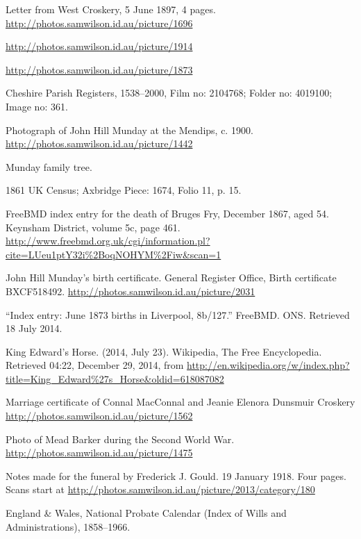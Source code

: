 \begin{thebibliography}{99}
	Letter from West Croskery, 5 June 1897, 4 pages.
	\url{http://photos.samwilson.id.au/picture/1696}

	\url{http://photos.samwilson.id.au/picture/1914}

	\url{http://photos.samwilson.id.au/picture/1873}

	Cheshire Parish Registers, 1538--2000, Film no: 2104768; Folder no: 4019100; Image no: 361.

	Photograph of John Hill Munday at the Mendips, c. 1900.
	\url{http://photos.samwilson.id.au/picture/1442}

	Munday family tree.

	1861 UK Census; Axbridge Piece: 1674, Folio 11, p. 15.

	FreeBMD index entry for the death of Bruges Fry, December 1867, aged 54. 
	Keynsham District, volume 5c, page 461.
	\url{http://www.freebmd.org.uk/cgi/information.pl?cite=LUeu1ptY32i\%2BoqNOHYM\%2Fiw&scan=1}

	John Hill Munday's birth certificate. General Register Office, Birth certificate BXCF518492.
	\url{http://photos.samwilson.id.au/picture/2031}

	``Index entry: June 1873 births in Liverpool, 8b/127.'' FreeBMD. ONS. Retrieved 18 July 2014.

	King Edward's Horse. (2014, July 23). Wikipedia, The Free Encyclopedia. Retrieved 04:22, December 29, 2014,
	from \url{http://en.wikipedia.org/w/index.php?title=King_Edward\%27s_Horse&oldid=618087082}

	Marriage certificate of Connal MacConnal and Jeanie Elenora Dunsmuir Croskery
	\url{http://photos.samwilson.id.au/picture/1562}

	Photo of Mead Barker during the Second World War. \\
	\url{http://photos.samwilson.id.au/picture/1475}

	Notes made for the funeral by Frederick J. Gould. 19 January 1918.
	Four pages. Scans start at \url{http://photos.samwilson.id.au/picture/2013/category/180}

	England \& Wales, National Probate Calendar (Index of Wills and Administrations), 1858--1966.


\end{thebibliography}
